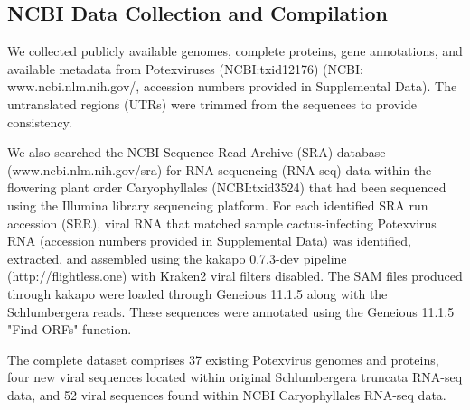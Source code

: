 \documentclass[11pt,letterpaper,titlepage]{article}
\begin{document}
\begin{linenumbers}
\subsection*{NCBI Data Collection and Compilation}
We collected publicly available genomes, complete proteins, gene annotations, and available metadata from Potexviruses (NCBI:txid12176) (NCBI: www.ncbi.nlm.nih.gov/, accession numbers provided in Supplemental Data). 
The untranslated regions (UTRs) were trimmed from the sequences to provide consistency.


We also searched the NCBI Sequence Read Archive (SRA) database (www.ncbi.nlm.nih.gov/sra) for RNA-sequencing (RNA-seq) data within the flowering plant order Caryophyllales (NCBI:txid3524) that had been sequenced using the Illumina library sequencing platform. 
For each identified SRA run accession (SRR), viral RNA that matched sample cactus-infecting Potexvirus RNA (accession numbers provided in Supplemental Data) was identified, extracted, and assembled using the kakapo 0.7.3-dev pipeline (http://flightless.one) with Kraken2 viral filters disabled. 
The SAM files produced through kakapo were loaded through Geneious 11.1.5 along with the Schlumbergera reads.
These sequences were annotated using the Geneious 11.1.5 "Find ORFs" function. 

The complete dataset comprises 37 existing Potexvirus genomes and proteins, four new viral sequences located within original Schlumbergera truncata RNA-seq data, and 52 viral sequences found within NCBI Caryophyllales RNA-seq data.


\end{linenumbers}
\end{document}
